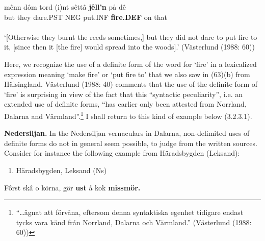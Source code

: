 \ea\label{}
\gll mênn  dôm  tord  (i)nt  sêttâ  \textbf{jêll’n} på  dê  \\


but  they  dare.PST  NEG  put.INF  \textbf{fire.DEF} on   that  \\ %


\ea\label{}
\\


‘[Otherwise they burnt the reeds sometimes,] but they did not dare to put fire to it, [since then it [the fire] would spread into the woods].’ (Västerlund (1988: 60))
\z

Here, we recognize the use of a definite form of the word for ‘fire’ in a lexicalized expression meaning ‘make fire’ or ‘put fire to’ that we also saw in (63)(b) from Hälsingland. Västerlund (1988: 40) comments that the use of the definite form of  ‘fire’ is surprising in view of the fact that this “syntactic peculiarity”, i.e. an extended use of definite forms, “has earlier only been attested from Norrland, Dalarna and Värmland”.\footnote{ “…ägnat att förvåna, eftersom denna syntaktiska egenhet tidigare endast tycks vara känd från Norrland, Dalarna och Värmland.” (Västerlund (1988: 60))} I shall return to this kind of example below (3.2.3.1).

\textbf{Nedersiljan.} In the Nedersiljan vernaculars in Dalarna, non-delimited uses of definite forms do not in general seem possible, to judge from the written sources. Consider for instance the following example from Häradsbygden (Leksand):

\begin{enumerate} %
\item 
Häradsbygden, Leksand (Ns) 

\end{enumerate} %
\ea\label{}
\gll Fôrst  skâ  o  körna,  gör  \textbf{ust} å  kok  \textbf{missmör.} \\


